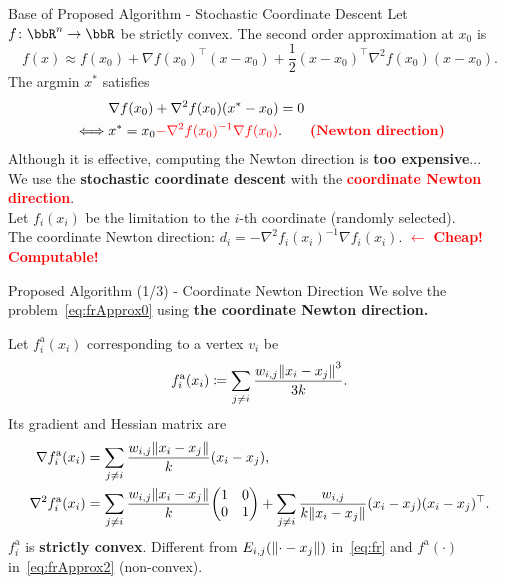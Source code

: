 \documentclass[dvipdfmx,13pt,aspectratio=169]{beamer}
\newcommand{\red}[1]{\textcolor{red}{#1}}
\newcommand{\defeq}{\coloneqq}
\newif\ifShowHidden
\begin{document}
\begin{frame}{Base of Proposed Algorithm - Stochastic Coordinate Descent}
  Let $f\colon \bbR^n \to \bbR$ be strictly convex. The second order approximation at $x_0$ is
  \begin{equation*}
    f(x) \approx f(x_0) + \nabla f(x_0)^\top (x - x_0) + \frac{1}{2} (x - x_0)^\top \nabla^2 f(x_0) (x - x_0).
  \end{equation*}
  The argmin $x^*$ satisfies
  \begin{align*}
         & \nabla f(x_0) + \nabla^2 f(x_0) (x^* - x_0) = 0                                                       \\
    \iff & x^* = x_0 \red{- \nabla^2 f(x_0)^{-1} \nabla f(x_0)}. \qquad \text{\textbf{\red{(Newton direction)}}}
  \end{align*}
  Although it is effective, computing the Newton direction is \textbf{too expensive}...\\[1em]

  We use the \large{\textbf{stochastic coordinate descent}} with the \large{\textbf{\red{coordinate Newton direction}}}.\\
  Let $f_i(x_i)$ be the limitation to the $i$-th coordinate (randomly selected).\\
  The coordinate Newton direction: $d_i = -\nabla^2 f_i(x_i)^{-1} \nabla f_i(x_i)$. \red{$\leftarrow$ \large{\textbf{Cheap! Computable!}}}
\end{frame}

\begin{frame}{Proposed Algorithm (1/3) - Coordinate Newton Direction}
  We solve the problem~\eqref{eq:frApprox0} using \textbf{the coordinate Newton direction.}

  Let $f^{\mathrm{a}}_i(x_i)$ corresponding to a vertex $v_i$ be
  \begin{equation*}
    f^{\mathrm{a}}_i(x_i) \defeq \sum_{j \neq i} \frac{w_{i,j}\norm{x_i - x_j}^3}{3k}.
  \end{equation*}
  Its gradient and Hessian matrix are
  \begin{align*}
    \nabla f^{\mathrm{a}}_i(x_i)   & = \sum_{j \neq i} \frac{w_{i,j}\norm{x_i - x_j}}{k} (x_i - x_j),     \\
    \nabla^2 f^{\mathrm{a}}_i(x_i) & = \sum_{j \neq i} \frac{w_{i,j}\norm{x_i - x_j}}{k} \mqty(1      & 0 \\0&1) + \sum_{j \neq i} \frac{w_{i,j}}{k\norm{x_i - x_j}} (x_i - x_j)(x_i - x_j)^\top.
  \end{align*}
  $f^{\mathrm{a}}_i$ is \textbf{strictly convex}.
  Different from $E_{i,j}(\norm{\cdot - x_j})$ in~\eqref{eq:fr} and $f^{\mathrm{a}}(\cdot)$ in~\eqref{eq:frApprox2} (non-convex).
\end{frame}
\end{document}
